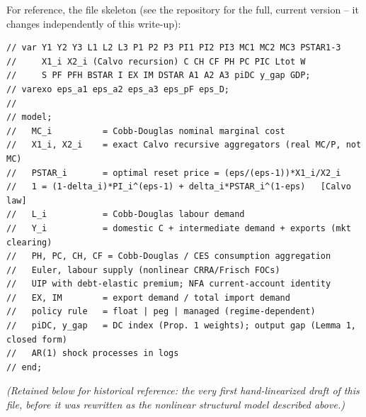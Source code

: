 \documentclass[11pt,a4paper]{article}
\begin{document}
For reference, the file skeleton (see the repository for the full,
current version -- it changes independently of this write-up):

\begin{lstlisting}[caption={open\_economy\_network.mod --- structure only, see repo for current content},label={lst:dynare}]
// var Y1 Y2 Y3 L1 L2 L3 P1 P2 P3 PI1 PI2 PI3 MC1 MC2 MC3 PSTAR1-3
//     X1_i X2_i (Calvo recursion) C CH CF PH PC PIC Ltot W
//     S PF PFH BSTAR I EX IM DSTAR A1 A2 A3 piDC y_gap GDP;
// varexo eps_a1 eps_a2 eps_a3 eps_pF eps_D;
//
// model;
//   MC_i          = Cobb-Douglas nominal marginal cost
//   X1_i, X2_i    = exact Calvo recursive aggregators (real MC/P, not MC)
//   PSTAR_i       = optimal reset price = (eps/(eps-1))*X1_i/X2_i
//   1 = (1-delta_i)*PI_i^(eps-1) + delta_i*PSTAR_i^(1-eps)   [Calvo law]
//   L_i           = Cobb-Douglas labour demand
//   Y_i           = domestic C + intermediate demand + exports (mkt clearing)
//   PH, PC, CH, CF = Cobb-Douglas / CES consumption aggregation
//   Euler, labour supply (nonlinear CRRA/Frisch FOCs)
//   UIP with debt-elastic premium; NFA current-account identity
//   EX, IM        = export demand / total import demand
//   policy rule   = float | peg | managed (regime-dependent)
//   piDC, y_gap   = DC index (Prop. 1 weights); output gap (Lemma 1, closed form)
//   AR(1) shock processes in logs
// end;
\end{lstlisting}

\emph{(Retained below for historical reference: the very first
hand-linearized draft of this file, before it was rewritten as the
nonlinear structural model described above.)}
\end{document}
